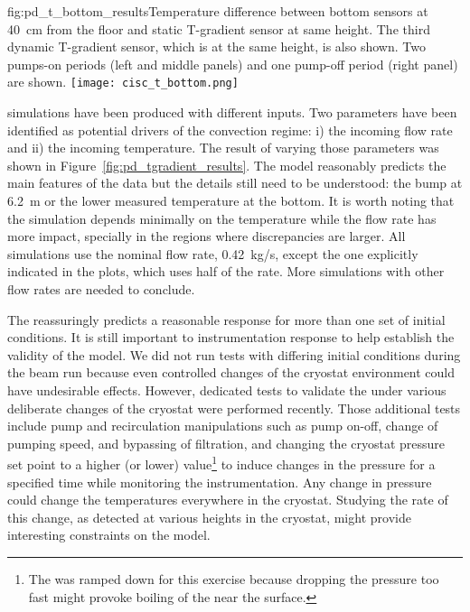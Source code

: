 \begin{dunefigure}{fig:pd_t_bottom_results}{Temperature difference between bottom sensors at 40~cm from the floor and static T-gradient sensor at same height. The third dynamic T-gradient sensor, which is  at the same height, is also shown. Two pumps-on periods (left and middle panels) and one pump-off period (right panel) are shown.}
  \texttt{[image: cisc\_t\_bottom.png]}%
\end{dunefigure}

 simulations have been produced with different inputs. Two parameters have been identified as potential drivers of the convection regime: i) the incoming  flow rate and ii) the incoming  temperature. The result of varying those parameters was shown in Figure~\ref{fig:pd_tgradient_results}. 
The  model reasonably predicts the main features of the data but the details still need to be understood: the bump at 6.2~m or the lower measured temperature at the bottom. It is worth noting that the simulation depends minimally on the  temperature while the flow rate has more impact, specially in the regions where discrepancies are larger. All simulations use the nominal  flow rate, 0.42~kg/s, except the one explicitly indicated 
in the plots, which uses half of the rate. More simulations with other  flow rates are needed to conclude.  

The  reassuringly predicts a reasonable response for more than one set of initial conditions. It is still important to %
instrumentation response to help establish the validity of the  model. We did not run tests with differing initial conditions during the beam run because even controlled changes of the cryostat environment could have undesirable effects. However, dedicated tests to validate the  under various deliberate changes of the cryostat were performed recently. Those  additional tests include pump and recirculation manipulations such as pump on-off, change of pumping speed, and bypassing of filtration, and changing the cryostat pressure set point to a higher (or lower) value\footnote{The  %
was ramped down for this exercise because dropping the pressure too fast might provoke boiling of the  near the surface.} to induce changes in the pressure for a specified time while monitoring the instrumentation. Any change in pressure could change the temperatures everywhere in the cryostat. Studying the rate of this change, as detected at various heights in the cryostat, might provide interesting constraints on the  model.

